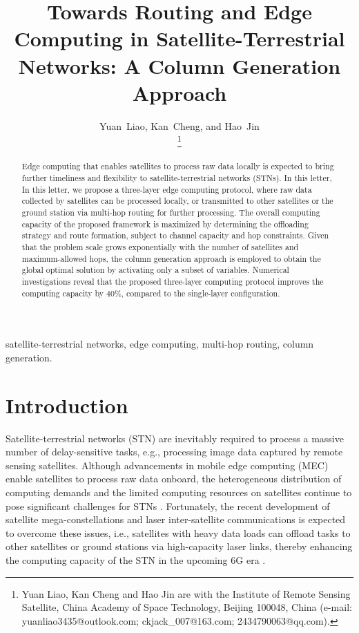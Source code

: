 \documentclass[journal,10pt]{IEEEtran}
\begin{document}

\title{\huge Towards Routing and Edge Computing in Satellite-Terrestrial Networks: A Column Generation Approach}

\author{
Yuan~Liao, Kan~Cheng, and Hao~Jin

\thanks{Yuan Liao, Kan Cheng and Hao Jin are with the Institute of Remote Sensing Satellite, China Academy of Space Technology, Beijing 100048, China (e-mail: yuanliao3435@outlook.com; ckjack\_007@163.com; 2434790063@qq.com).}
}

\maketitle


\begin{abstract}
Edge computing that enables satellites to process raw data locally is expected to bring further timeliness and flexibility to satellite-terrestrial networks (STNs). In this letter, In this letter, we propose a three-layer edge computing protocol, where raw data collected by satellites can be processed locally, or transmitted to other satellites or the ground station via multi-hop routing for further processing. The overall computing capacity of the proposed framework is maximized by determining the offloading strategy and route formation, subject to channel capacity and hop constraints. Given that the problem scale grows exponentially with the number of satellites and maximum-allowed hops, the column generation approach is employed to obtain the global optimal solution by activating only a subset of variables. Numerical investigations reveal that the proposed three-layer computing protocol improves the computing capacity by 40\%, compared to the single-layer configuration.  
\end{abstract}

\begin{IEEEkeywords} satellite-terrestrial networks, edge computing, multi-hop routing, column generation.
\end{IEEEkeywords}

\IEEEpeerreviewmaketitle

\section{Introduction}
\label{introduction}

Satellite-terrestrial networks (STN) are inevitably required to process a massive number of delay-sensitive tasks, e.g., processing image data captured by remote sensing satellites. Although advancements in mobile edge computing (MEC) enable satellites to process raw data onboard, the heterogeneous distribution of computing demands and the limited computing resources on satellites continue to pose significant challenges for STNs \cite{xie2020satellite}. Fortunately, the recent development of satellite mega-constellations and laser inter-satellite communications is expected to overcome these issues, i.e., satellites with heavy data loads can offload tasks to other satellites or ground stations via high-capacity laser links, thereby enhancing the computing capacity of the STN in the upcoming 6G era \cite{bhattacharjee2024demand}.
\end{document}
